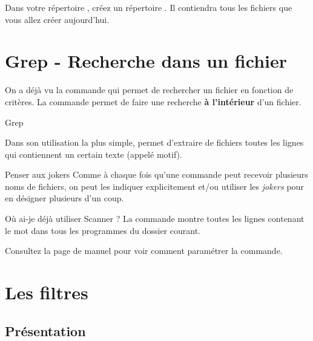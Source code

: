 \documentclass[a4paper,11pt]{style-esi/td}
\begin{document}
\entete
\titre
{}
\lastedit

\bigskip
\tableofcontents

\vfill
\begin{infobox}
    Dans votre répertoire , 
	créez un répertoire . 
    Il contiendra tous les fichiers que vous allez créer aujourd'hui. 
\end{infobox}
\vfill

\newpage

\section{Grep - Recherche dans un fichier}

	On a déjà vu la commande 
	qui permet de rechercher un fichier en fonction de critères.
	La commande  permet de faire une recherche 
	\textbf{à l'intérieur} d'un fichier.

	\begin{theorie}{Grep}

		\medskip
		Dans son utilisation la plus simple, 
		permet d’extraire de fichiers 
		toutes les lignes qui contiennent un certain texte 
		(appelé motif).
	\end{theorie}

	\begin{infotbox}{Penser aux jokers}
		Comme à chaque fois qu'une commande peut recevoir plusieurs noms de fichiers,
		on peut les indiquer explicitement et/ou utiliser les \emph{jokers}
		pour en désigner plusieurs d'un coup.
	\end{infotbox}

	\begin{Exemple}{Où ai-je déjà utiliser Scanner ?}
		La commande  montre toutes les lignes
		contenant le mot 
		dans tous les programmes  du dossier courant.
	\end{Exemple}

	Consultez la page de manuel pour voir comment paramétrer la commande.

\section{Les filtres}

	\subsection{Présentation}
\end{document}
